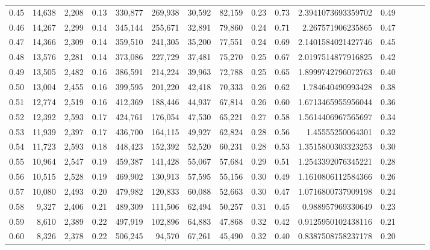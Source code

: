 \begin{tabular}{rrrrrrrrrrrrrrr}
0.45 &  14,638 &  2,208 &  0.13 &  330,877 &  269,938 &   30,592 &   82,159 &  0.23 &  0.73 &      2.3941073693359702 &      0.49 \\
0.46 &  14,267 &  2,299 &  0.14 &  345,144 &  255,671 &   32,891 &   79,860 &  0.24 &  0.71 &       2.267571906235865 &      0.47 \\
0.47 &  14,366 &  2,309 &  0.14 &  359,510 &  241,305 &   35,200 &   77,551 &  0.24 &  0.69 &      2.1401584021427746 &      0.45 \\
0.48 &  13,576 &  2,281 &  0.14 &  373,086 &  227,729 &   37,481 &   75,270 &  0.25 &  0.67 &      2.0197514877916825 &      0.42 \\
0.49 &  13,505 &  2,482 &  0.16 &  386,591 &  214,224 &   39,963 &   72,788 &  0.25 &  0.65 &      1.8999742796072763 &      0.40 \\
0.50 &  13,004 &  2,455 &  0.16 &  399,595 &  201,220 &   42,418 &   70,333 &  0.26 &  0.62 &       1.784640490993428 &      0.38 \\
0.51 &  12,774 &  2,519 &  0.16 &  412,369 &  188,446 &   44,937 &   67,814 &  0.26 &  0.60 &      1.6713465955956044 &      0.36 \\
0.52 &  12,392 &  2,593 &  0.17 &  424,761 &  176,054 &   47,530 &   65,221 &  0.27 &  0.58 &      1.5614406967565697 &      0.34 \\
0.53 &  11,939 &  2,397 &  0.17 &  436,700 &  164,115 &   49,927 &   62,824 &  0.28 &  0.56 &        1.45555250064301 &      0.32 \\
0.54 &  11,723 &  2,593 &  0.18 &  448,423 &  152,392 &   52,520 &   60,231 &  0.28 &  0.53 &      1.3515800303323253 &      0.30 \\
0.55 &  10,964 &  2,547 &  0.19 &  459,387 &  141,428 &   55,067 &   57,684 &  0.29 &  0.51 &      1.2543392076345221 &      0.28 \\
0.56 &  10,515 &  2,528 &  0.19 &  469,902 &  130,913 &   57,595 &   55,156 &  0.30 &  0.49 &      1.1610806112584366 &      0.26 \\
0.57 &  10,080 &  2,493 &  0.20 &  479,982 &  120,833 &   60,088 &   52,663 &  0.30 &  0.47 &      1.0716800737909198 &      0.24 \\
0.58 &   9,327 &  2,406 &  0.21 &  489,309 &  111,506 &   62,494 &   50,257 &  0.31 &  0.45 &       0.988957969330649 &      0.23 \\
0.59 &   8,610 &  2,389 &  0.22 &  497,919 &  102,896 &   64,883 &   47,868 &  0.32 &  0.42 &      0.9125950102438116 &      0.21 \\
0.60 &   8,326 &  2,378 &  0.22 &  506,245 &   94,570 &   67,261 &   45,490 &  0.32 &  0.40 &      0.8387508758237178 &      0.20 \\

\end{tabular}
